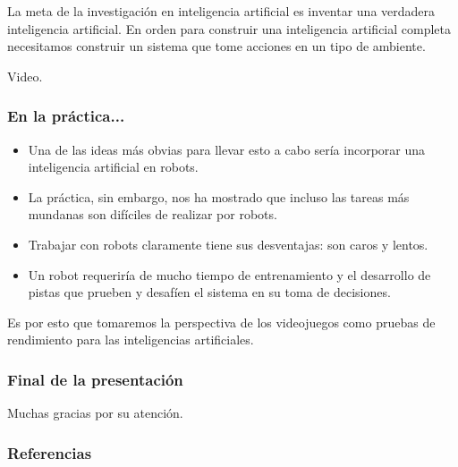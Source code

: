 \documentclass[aspectratio=169]{beamer}
\begin{document}
\begin{frame}
\begin{center}
La meta de la investigación en inteligencia artificial es inventar una
verdadera inteligencia artificial. En orden para construir una inteligencia
artificial completa necesitamos construir un sistema que tome acciones en un
tipo de ambiente.
\end{center}
\end{frame}

\begin{frame}
\begin{center}
Video.
\end{center}
\end{frame}

\begin{frame}
\frametitle{En la práctica...}
\begin{itemize}[<+->]
\item Una de las ideas más obvias para llevar esto a cabo sería incorporar una
  inteligencia artificial en robots.
\item La práctica, sin embargo, nos ha mostrado que incluso las tareas más
  mundanas son difíciles de realizar por robots. 
\item Trabajar con robots claramente tiene sus desventajas: son caros y lentos.
\item Un robot requeriría de mucho tiempo de entrenamiento y el desarrollo de
  pistas que prueben y desafíen el sistema en su toma de decisiones.
\end{itemize}
\end{frame}

\begin{frame}
\begin{center}
Es por esto que tomaremos la perspectiva de los videojuegos como pruebas de
rendimiento para las inteligencias artificiales.
\end{center}
\end{frame}

\begin{frame}
\frametitle{Final de la presentación}

Muchas gracias por su atención.
\end{frame}

\begin{frame}
\frametitle{Referencias}
\end{frame}
\end{document}
